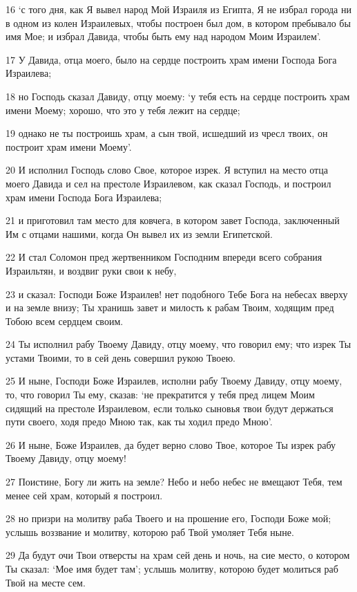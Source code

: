 \par 16 `с того дня, как Я вывел народ Мой Израиля из Египта, Я не избрал города ни в одном из колен Израилевых, чтобы построен был дом, в котором пребывало бы имя Мое; и избрал Давида, чтобы быть ему над народом Моим Израилем'.
\par 17 У Давида, отца моего, было на сердце построить храм имени Господа Бога Израилева;
\par 18 но Господь сказал Давиду, отцу моему: `у тебя есть на сердце построить храм имени Моему; хорошо, что это у тебя лежит на сердце;
\par 19 однако не ты построишь храм, а сын твой, исшедший из чресл твоих, он построит храм имени Моему'.
\par 20 И исполнил Господь слово Свое, которое изрек. Я вступил на место отца моего Давида и сел на престоле Израилевом, как сказал Господь, и построил храм имени Господа Бога Израилева;
\par 21 и приготовил там место для ковчега, в котором завет Господа, заключенный Им с отцами нашими, когда Он вывел их из земли Египетской.
\par 22 И стал Соломон пред жертвенником Господним впереди всего собрания Израильтян, и воздвиг руки свои к небу,
\par 23 и сказал: Господи Боже Израилев! нет подобного Тебе Бога на небесах вверху и на земле внизу; Ты хранишь завет и милость к рабам Твоим, ходящим пред Тобою всем сердцем своим.
\par 24 Ты исполнил рабу Твоему Давиду, отцу моему, что говорил ему; что изрек Ты устами Твоими, то в сей день совершил рукою Твоею.
\par 25 И ныне, Господи Боже Израилев, исполни рабу Твоему Давиду, отцу моему, то, что говорил Ты ему, сказав: `не прекратится у тебя пред лицем Моим сидящий на престоле Израилевом, если только сыновья твои будут держаться пути своего, ходя предо Мною так, как ты ходил предо Мною'.
\par 26 И ныне, Боже Израилев, да будет верно слово Твое, которое Ты изрек рабу Твоему Давиду, отцу моему!
\par 27 Поистине, Богу ли жить на земле? Небо и небо небес не вмещают Тебя, тем менее сей храм, который я построил.
\par 28 но призри на молитву раба Твоего и на прошение его, Господи Боже мой; услышь воззвание и молитву, которою раб Твой умоляет Тебя ныне.
\par 29 Да будут очи Твои отверсты на храм сей день и ночь, на сие место, о котором Ты сказал: `Мое имя будет там'; услышь молитву, которою будет молиться раб Твой на месте сем.
